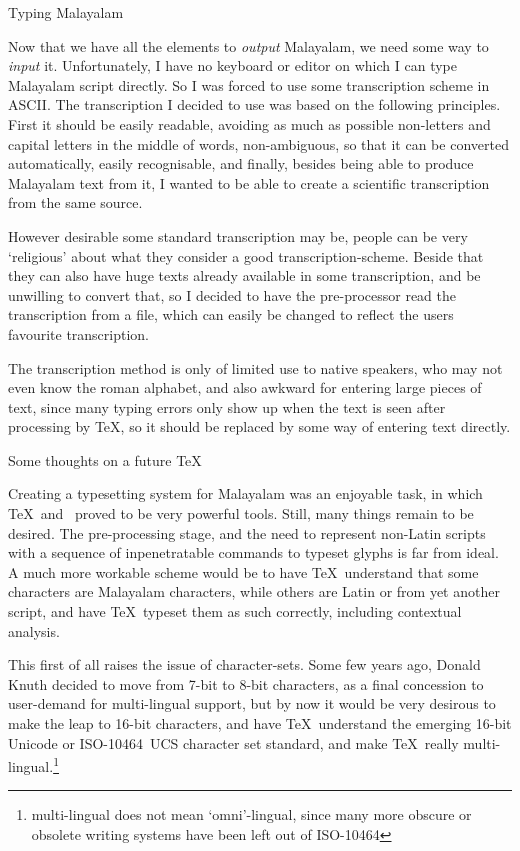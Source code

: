 \beginsection Typing Malayalam

Now that we have all the elements to {\it output\/} Malayalam, we need
some way to {\it input\/} it. Unfortunately, I have no keyboard or
editor on which I can type Malayalam script directly. So I was forced
to use some transcription scheme in ASCII. The transcription I decided
to use was based on the following principles. First it should be
easily readable, avoiding as much as possible non-letters and capital
letters in the middle of words, non-ambiguous, so that it can be
converted automatically, easily recognisable, and finally, besides
being able to produce Malayalam text from it, I wanted to be able to
create a scientific transcription from the same source.

However desirable some standard transcription may be, people can be
very `religious' about what they consider a good transcription-scheme.
Beside that they can also have huge texts already available in some
transcription, and be unwilling to convert that, so I decided to have
the pre-processor read the transcription from a file, which can easily
be changed to reflect the users favourite transcription.

The transcription method is only of limited use to native speakers,
who may not even know the roman alphabet, and also awkward for
entering large pieces of text, since many typing errors only show up
when the text is seen after processing by \TeX, so it should be
replaced by some way of entering text directly.

\beginsection Some thoughts on a future \TeX\par

Creating a typesetting system for Malayalam was an enjoyable task, in
which \TeX\ and \MF\ proved to be very powerful tools. Still, many
things remain to be desired. The pre-processing stage, and the need to
represent non-Latin scripts with a sequence of inpenetratable commands
to typeset glyphs is far from ideal. A much more workable scheme would
be to have \TeX\ understand that some characters are Malayalam
characters, while others are Latin or from yet another script, and
have \TeX\ typeset them as such correctly, including contextual
analysis.

This first of all raises the issue of character-sets. Some few years
ago, Donald Knuth decided to move from 7-bit to 8-bit characters, as a
final concession to user-demand for multi-lingual support, but by now
it would be very desirous to make the leap to 16-bit characters, and
have \TeX\ understand the emerging 16-bit Unicode or ISO-10464~UCS
character set standard, and make \TeX\ really
multi-lingual.\footnote*{multi-lingual does not mean `omni'-lingual,
since many more obscure or obsolete writing systems have been left
out of ISO-10464}

